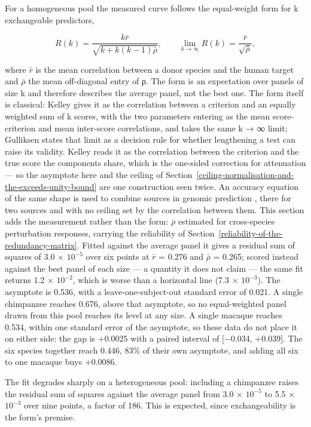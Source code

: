 \documentclass[11pt,a4paper]{article}
\begin{document}
For a homogeneous pool the measured curve follows the equal-weight form
for k exchangeable predictors,

\[R(k) = \frac{k\bar{r}}{\sqrt{k + k(k-1)\bar{\rho}}},
\qquad \lim_{k\to\infty} R(k) = \frac{\bar{r}}{\sqrt{\bar{\rho}}},\]

where \ensuremath{\bar{r}} is the mean correlation between a donor species and the human
target and \ensuremath{\bar{\rho}} the mean off-diagonal entry of ρ. The form is an
expectation over panels of size k and therefore describes the average
panel, not the best one. The form itself is classical: Kelley \cite{ref29}
gives it as the correlation between a criterion and an equally weighted
sum of k scores, with the two parameters entering as the mean
score-criterion and mean inter-score correlations, and takes the same k
→ ∞ limit; Gulliksen \cite{ref30} states that limit as a decision rule for
whether lengthening a test can raise its validity. Kelley reads it as
the correlation between the criterion and the true score the components
share, which is the one-sided correction for attenuation --- so the
asymptote here and the ceiling of Section~\ref{ceiling-normalisation-and-the-exceeds-unity-bound} are one construction seen
twice. An accuracy equation of the same shape is used to combine sources
in genomic prediction \cite{ref31}, there for two sources and with no
ceiling set by the correlation between them. This section adds the
measurement rather than the form: \ensuremath{\bar{\rho}} estimated for cross-species
perturbation responses, carrying the reliability of Section~\ref{reliability-of-the-redundancy-matrix}. Fitted
against the average panel it gives a residual sum of squares of 3.0 ×
\ensuremath{10^{-5}} over six points at \ensuremath{\bar{r}} = 0.276 and \ensuremath{\bar{\rho}} = 0.265; scored instead against
the best panel of each size --- a quantity it does not claim --- the
same fit returns 1.2 × \ensuremath{10^{-2}}, which is worse than a horizontal line (7.3
× \ensuremath{10^{-3}}). The asymptote is 0.536, with a leave-one-subject-out standard
error of 0.021. A single chimpanzee reaches 0.676, above that asymptote,
so no equal-weighted panel drawn from this pool reaches its level at any
size. A single macaque reaches 0.534, within one standard error of the
asymptote, so these data do not place it on either side: the gap is
+0.0025 with a paired interval of {[}−0.034, +0.039{]}. The six species
together reach 0.446, 83\% of their own asymptote, and adding all six to
one macaque buys +0.0086.

The fit degrades sharply on a heterogeneous pool: including a chimpanzee
raises the residual sum of squares against the average panel from 3.0 ×
\ensuremath{10^{-5}} to 5.5 × \ensuremath{10^{-3}} over nine points, a factor of 186. This is expected,
since exchangeability is the form's premise.
\end{document}
